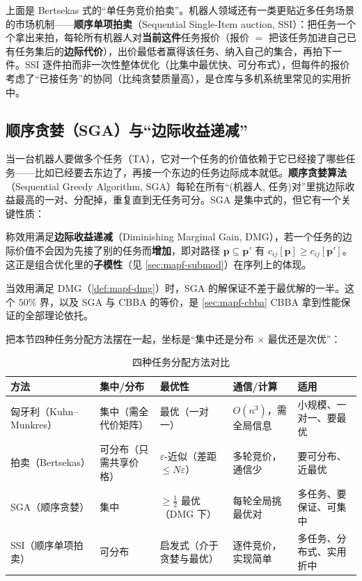 上面是 Bertsekas 式的“单任务竞价拍卖”。机器人领域还有一类更贴近多任务场景的市场机制——\textbf{顺序单项拍卖}（Sequential Single-Item auction, SSI）\cite{koenig2006ssi}：把任务一个个拿出来拍，每轮所有机器人对\textbf{当前这件}任务报价（报价 $=$ 把该任务加进自己已有任务集后的\textbf{边际代价}），出价最低者赢得该任务、纳入自己的集合，再拍下一件。SSI 逐件拍而非一次性整体优化（比集中最优快、可分布式），但每件的报价考虑了“已接任务”的协同（比纯贪婪质量高），是仓库与多机系统里常见的实用折中。

\subsection{顺序贪婪（SGA）与“边际收益递减”}
\label{sec:mapf-sga}

当一台机器人要做多个任务（TA），它对一个任务的价值依赖于它已经接了哪些任务——比如已经要去东边了，再接一个东边的任务边际成本就低。\textbf{顺序贪婪算法}（Sequential Greedy Algorithm, SGA）每轮在所有“(机器人, 任务)对”里挑边际收益最高的一对、分配掉，重复直到无任务可分。SGA 是集中式的，但它有一个关键性质：

\begin{definition}\label{def:mapf-dmg}
称效用满足\textbf{边际收益递减}（Diminishing Marginal Gain, DMG），若一个任务的边际价值不会因为先接了别的任务而\textbf{增加}，即对路径 $\mathbf{p}\subseteq\mathbf{p}'$ 有 $c_{ij}[\mathbf{p}]\ge c_{ij}[\mathbf{p}']$。这正是组合优化里的\textbf{子模性}（见 \cref{sec:mapf-submod}）在序列上的体现。
\end{definition}

\begin{theorem}[SGA 的 $50\%$ 界]\label{thm:mapf-sga}
当效用满足 DMG（\cref{def:mapf-dmg}）时，SGA 的解保证不差于最优解的一半。这个 $50\%$ 界，以及 SGA 与 CBBA 的等价，是 \cref{sec:mapf-cbba} CBBA 拿到性能保证的全部理论依托。
\end{theorem}

把本节四种任务分配方法摆在一起，坐标是“集中还是分布 $\times$ 最优还是次优”：

\begin{table}[H]\centering\small
\caption{四种任务分配方法对比}
\label{tab:mapf-assign-compare}
\begin{tabularx}{\linewidth}{lLLLL}
\toprule
方法 & 集中/分布 & 最优性 & 通信/计算 & 适用 \\
\midrule
匈牙利（Kuhn--Munkres） & 集中（需全代价矩阵） & 最优（一对一） & $O(n^3)$，需全局信息 & 小规模、一对一、要最优 \\
拍卖（Bertsekas） & 可分布（只需共享价格） & $\varepsilon$-近似（差距 $\le N\varepsilon$） & 多轮竞价，通信少 & 要可分布、近最优 \\
SGA（顺序贪婪） & 集中 & $\ge\tfrac12$ 最优（DMG 下） & 每轮全局挑最优对 & 多任务、要保证、可集中 \\
SSI（顺序单项拍卖） & 可分布 & 启发式（介于贪婪与最优） & 逐件竞价，实现简单 & 多任务、分布式、实用折中 \\
\bottomrule
\end{tabularx}
\end{table}

